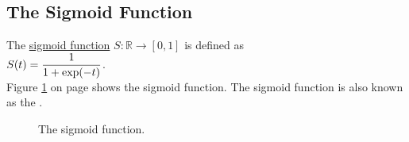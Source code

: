 \subsection{The Sigmoid Function}
\begin{Definition}
  The \href{https://en.wikipedia.org/wiki/Sigmoid_function}{sigmoid function} $S: \mathbb{R} \rightarrow [0, 1]$
   is defined as 
\\[0.2cm]
\hspace*{1.3cm}
$\displaystyle S(t) = \frac{1}{1 + \exp(-t)}$.  
\\[0.2cm]
Figure \ref{fig:sigmoid.eps} on page \pageref{fig:sigmoid.eps} shows the sigmoid function.
The sigmoid function is also known as the  .
\eox
\end{Definition}

\begin{figure}[!ht]
\centering
{}
\vspace*{-0.3cm}
\caption{The sigmoid function.}
\label{fig:sigmoid.eps}
\end{figure}


